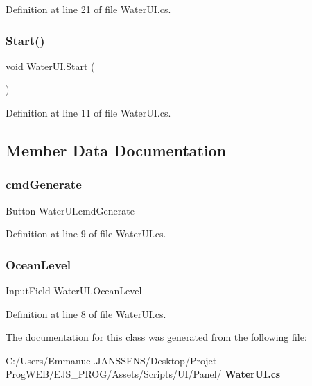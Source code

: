 Definition at line 21 of file Water\+U\+I.\+cs.

\mbox{\label{class_water_u_i_a332875d7103b54c4f9c6d9340c3e8cf1}} 
\subsubsection{Start()}
{\footnotesize\ttfamily void Water\+U\+I.\+Start (\begin{DoxyParamCaption}{ }\end{DoxyParamCaption})}



Definition at line 11 of file Water\+U\+I.\+cs.



\subsection{Member Data Documentation}
\mbox{\label{class_water_u_i_a40847883aeae0f86c4b6e1e44ece5eb2}} 
\subsubsection{cmd\+Generate}
{\footnotesize\ttfamily Button Water\+U\+I.\+cmd\+Generate}



Definition at line 9 of file Water\+U\+I.\+cs.

\mbox{\label{class_water_u_i_ad9f354cee4d64b5fad037cd3e16a4ad5}} 
\subsubsection{Ocean\+Level}
{\footnotesize\ttfamily Input\+Field Water\+U\+I.\+Ocean\+Level}



Definition at line 8 of file Water\+U\+I.\+cs.



The documentation for this class was generated from the following file\+:\begin{DoxyCompactItemize}
\item 
C\+:/\+Users/\+Emmanuel.\+J\+A\+N\+S\+S\+E\+N\+S/\+Desktop/\+Projet Prog\+W\+E\+B/\+E\+J\+S\+\_\+\+P\+R\+O\+G/\+Assets/\+Scripts/\+U\+I/\+Panel/\textbf{ Water\+U\+I.\+cs}\end{DoxyCompactItemize}
